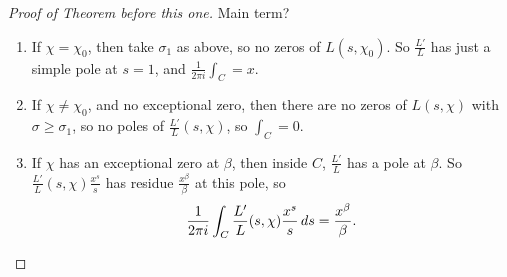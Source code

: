 \documentclass{article}
\newcommand{\1}{\mathbbm{1}}
\begin{document}
\begin{proof}[Proof of Theorem before this one]
  Main term?
  \begin{enumerate}
    \item If $\chi = \chi_0$, then take $\sigma_1$ as above, so no zeros of $L(s,\chi_0)$. So $\frac{L'}{L}$ has just a simple pole at $s=1$, and $\frac{1}{2\pi i}\int_C = x$.
    \item If $\chi \neq \chi_0$, and no exceptional zero, then there are no zeros of $L(s,\chi)$ with $\sigma \geq \sigma_1$, so no poles of $\frac{L'}{L}(s,\chi)$, so $\int_C = 0$.
    \item If $\chi$ has an exceptional zero at $\beta$, then inside $C$, $\frac{L'}{L}$ has a pole at $\beta$.
  So $\frac{L'}{L}(s,\chi) \frac{x^s}{s}$ has residue $\frac{x^\beta}{\beta}$ at this pole, so
  \begin{equation*}
    \frac{1}{2\pi i} \int_C \frac{L'}{L}(s,\chi) \frac{x^s}{s} \,ds = \frac{x^\beta}{\beta}. \qedhere
  \end{equation*}
  \end{enumerate}
\end{proof}
\end{document}

